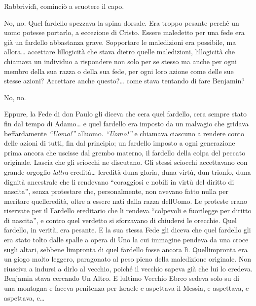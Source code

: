 Rabbrividì, cominciò a scuotere il capo.

No, no. Quel fardello spezzava la spina dorsale. Era troppo pesante
perché un uomo potesse portarlo, a eccezione di Cristo. Essere maledetto
per una fede era già un fardello abbastanza grave. Sopportare le
maledizioni era possibile, ma allora\ldots{} accettare
l\textquotesingle illogicità che stava dietro quelle maledizioni,
l\textquotesingle illogicità che chiamava un individuo a rispondere non
solo per se stesso ma anche per ogni membro della sua razza o della sua
fede, per ogni loro azione come delle sue stesse azioni? Accettare anche
questo?\ldots{} come stava tentando di fare Benjamin?

No, no.

Eppure, la Fede di don Paulo gli diceva che c\textquotesingle era quel
fardello, c\textquotesingle era sempre stato fin dal tempo di
Adamo\ldots{} e quel fardello era imposto da un malvagio che gridava
beffardamente \emph{``Uomo!''} all\textquotesingle uomo.
\emph{``Uomo!''} e chiamava ciascuno a rendere conto delle azioni di
tutti, fin dal principio; un fardello imposto a ogni generazione prima
ancora che uscisse dal grembo materno, il fardello della colpa del
peccato originale. Lascia che gli sciocchi ne discutano. Gli stessi
sciocchi accettavano con grande orgoglio \emph{l\textquotesingle altra}
eredità\ldots{} l\textquotesingle eredità d\textquotesingle una gloria,
d\textquotesingle una virtù, d\textquotesingle un trionfo,
d\textquotesingle una dignità ancestrale che li rendevano ``coraggiosi e
nobili in virtù del diritto di nascita'', senza protestare che,
personalmente, non avevano fatto nulla per meritare
quell\textquotesingle eredità, oltre a essere nati dalla razza
dell\textquotesingle Uomo. Le proteste erano riservate per il Fardello
ereditario che li rendeva ``colpevoli e fuorilegge per diritto di
nascita'', e contro quel verdetto si sforzavano di chiudersi le
orecchie. Quel fardello, in verità, era pesante. E la sua stessa Fede
gli diceva che quel fardello gli era stato tolto dalle spalle a opera di
Uno la cui immagine pendeva da una croce sugli altari, sebbene
l\textquotesingle impronta di quel fardello fosse ancora lì.
Quell\textquotesingle impronta era un giogo molto leggero, paragonato al
peso pieno della maledizione originale. Non riusciva a indursi a dirlo
al vecchio, poiché il vecchio sapeva già che lui lo credeva. Benjamin
stava cercando Un Altro. E l\textquotesingle ultimo Vecchio Ebreo sedeva
solo su di una montagna e faceva penitenza per Israele e aspettava il
Messia, e aspettava, e aspettava, e\ldots{}


